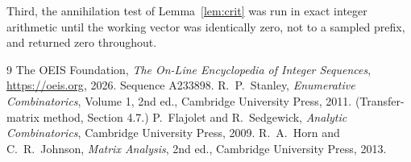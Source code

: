 \documentclass[11pt,a4paper]{article}
\theoremstyle{plain}
\theoremstyle{definition}
\begin{document}
Third, the annihilation test of Lemma~\ref{lem:crit} was run in exact integer arithmetic
until the working vector was identically zero, not to a sampled prefix, and returned zero
throughout.

\begin{thebibliography}{9}
 The OEIS Foundation, \emph{The On-Line Encyclopedia of Integer
Sequences}, \url{https://oeis.org}, 2026. Sequence A233898.
 R.~P.~Stanley, \emph{Enumerative Combinatorics}, Volume 1, 2nd ed.,
Cambridge University Press, 2011. (Transfer-matrix method, Section 4.7.)
 P.~Flajolet and R.~Sedgewick, \emph{Analytic Combinatorics}, Cambridge
University Press, 2009.
 R.~A.~Horn and C.~R.~Johnson, \emph{Matrix Analysis}, 2nd ed., Cambridge
University Press, 2013.
\end{thebibliography}
\end{document}
